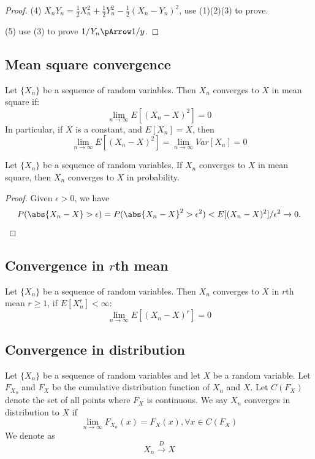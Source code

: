 \begin{refsection}
\begin{proof}
	(4) $X_nY_n = \frac{1}{2}X_n^2 + \frac{1}{2}Y_n^2 - \frac{1}{2}(X_n-Y_n)^2$, use (1)(2)(3) to prove. 
	
	(5) use (3) to prove $1/Y_n \pArrow 1/y$.
\end{proof}





\subsection{Mean square convergence}
\begin{definition}
Let $\{X_n\}$ be a sequence of random variables. Then $X_n$ converges to $X$ in mean square if:
$$\lim_{n\rightarrow \infty }E[(X_n - X)^2] = 0$$
In particular, if $X$ is a constant, and $E[X_n] = X$, then
$$\lim_{n\rightarrow \infty }E[(X_n - X)^2] = \lim_{n\rightarrow \infty }Var[X_n] = 0$$
\end{definition}


\begin{theorem}\label{ch:theory-of-probability:th:convergenceMSimpliesconvergeninProb}
Let $\{X_n\}$ be a sequence of random variables. If $X_n$ converges to $X$ in mean square, then $X_n$ converges to $X$ in probability.
\end{theorem}
\begin{proof}
Given $\epsilon > 0$, we have
$$P(\abs{X_n-X} > \epsilon)=P(\abs{X_n-X}^2 > \epsilon^2) < E[(X_n-X)^2]/\epsilon^2 \to 0.$$
\end{proof}

\subsection{Convergence in $r$th mean}
\begin{definition}\cite[308]{grimmett2001probability}
Let $\{X_n\}$ be a sequence of random variables. Then $X_n$ converges to $X$ in $r$th mean $r\geq 1$, if $E[X_n^r] < \infty$:
$$\lim_{n\rightarrow \infty }E[(X_n - X)^r] = 0$$
\end{definition}




\subsection{Convergence in distribution }
\begin{definition}
\cite[300]{hoggintroduction}Let $\{X_n\}$ be a sequence of random variables and let $X$ be a random variable. Let $F_{X_n}$ and $F_X$ be the cumulative distribution function of $X_n$ and $X$. Let $C(F_X)$ denote the set of all points where $F_X$ is continuous. We say $X_n$ converges in distribution to $X$ if
$$\lim_{n\rightarrow \infty} F_{X_n}(x) = F_X(x), \forall x\in C(F_X)$$We denote as 
$$X_n \xrightarrow[ ]{D} X $$
\end{definition}



\end{refsection}
